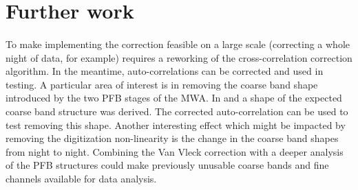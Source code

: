\documentclass[11pt]{article}
\begin{document}
\section{Further work}
\paragraph{}To make implementing the correction feasible on a large scale (correcting a whole night of data, for example) requires a reworking of the cross-correlation correction algorithm. In the meantime, auto-correlations can be corrected and used in testing. A particular area of interest is in removing the coarse band shape introduced by the two PFB stages of the MWA. In \cite{levine_effects} and \cite{levine_math} a shape of the expected coarse band structure was derived. The corrected auto-correlation can be used to test removing this shape. Another interesting effect which might be impacted by removing the digitization non-linearity is the change in the coarse band shapes from night to night. Combining the Van Vleck correction with a deeper analysis of the PFB structures could make previously unusable coarse bands and fine channels available for data analysis. 

\pagebreak
\printbibliography
%
\end{document}
